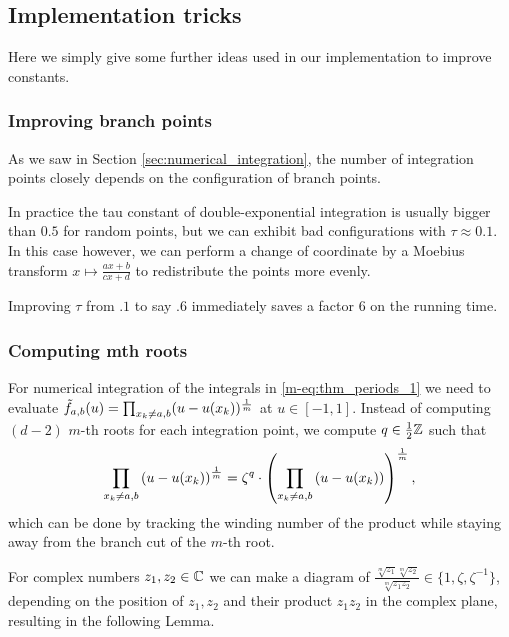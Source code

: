\documentclass[main.tex]{subfiles}
\begin{document}
   \subsection{Implementation tricks}

   Here we simply give some further ideas used in our implementation to improve constants.

   \subsubsection{Improving branch points}

   As we saw in Section \ref{sec:numerical_integration}, the number of integration points
   closely depends on the configuration of branch points.

   In practice the tau constant of double-exponential integration is usually bigger than $0.5$
   for random points, but we can exhibit bad configurations with $τ\approx 0.1$. In this case
   however, we can perform a change of coordinate by a Moebius transform
   $x\mapsto \frac{ax+b}{cx+d}$ to redistribute the points more evenly.

   Improving $τ$ from $.1$ to say $.6$ immediately saves a factor $6$ on the running time.

  \subsubsection{Computing mth roots}
  \label{sec:computingroots}

  For numerical integration of the integrals in \eqref{m-eq:thm_periods_1}
  we need to evaluate $\tilde{f}_{a,b}(u) = \prod_{x_k \ne a,b} (u-u(x_k))^{\frac{1}{m}}$ at $u
  \in [-1,1]$. Instead of computing $(d-2)$ $m$-th roots for each
  integration point, we compute $q \in \frac12\mathbb{Z}$ such that $$\prod_{x_k \ne a,b}
  \left(u - u(x_k) \right)^{\frac{1}{m}} = \zeta^q \cdot \left( \prod_{x_k \ne a,b}
  \left( u - u(x_k) \right) \right)^{\frac{1}{m}} ,$$ which can be done by tracking
  the winding number of the product while staying away from the branch cut
  of the $m$-th root.

  For complex numbers $z_1,z_2 \in \mathbb{C}$ we can make a diagram of
  $\frac{\sqrt[m]{z_1}\sqrt[m]{z_2}}{\sqrt[m]{z_1z_2}} \in \{ 1, \zeta,
  \zeta^{-1} \}$, depending on the position of $z_1,z_2$ and their product
  $z_1z_2$ in the complex plane, resulting in the following Lemma.
\end{document}
